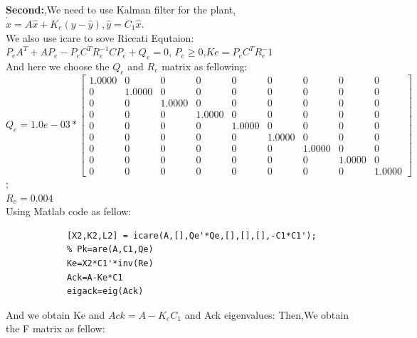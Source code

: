 \documentclass[12pt, a4paper]{article}
\begin{document}
\begin{enumerate}[1.]
\begin{enumerate}[(a)]
        \textbf{Second:},We need to use Kalman filter for the plant,
        $ \dot{\hat{x}}=A\hat{x}+K_e(y-\hat{y}),\hat{y}=C_1\hat{x}$. \\
        We also use icare to sove Riccati Equtaion:\\
        $ P_eA^T+AP_e-P_eC^TR_e^{-1}CP_e+Q_e=0 $, $ P_e \geq 0 $,$ Ke=P_eC^TR_e^-1 $ \\
        And here we choose the $ Q_e $ and $ R_e $ matrix as fellowing:\\
        $Q_e=1.0e-03 *\begin{bmatrix}
            1.0000&         0&         0&         0&         0&         0&         0&         0&         0 \\
                 0&    1.0000&         0&         0&         0&         0&         0&         0&         0 \\
                 0&         0&    1.0000&         0&         0&         0&         0&         0&         0 \\
                 0&         0&         0&    1.0000&         0&         0&         0&         0&         0 \\
                 0&         0&         0&         0&    1.0000&         0&         0&         0&         0 \\
                 0&         0&         0&         0&         0&    1.0000&         0&         0&         0 \\
                 0&         0&         0&         0&         0&         0&    1.0000&         0&         0 \\
                 0&         0&         0&         0&         0&         0&         0&    1.0000&         0 \\
                 0&         0&         0&         0&         0&         0&         0&         0&    1.0000 
            \end{bmatrix}
        $;\\
        $ R_e=0.004 $ \\
        Using Matlab code as fellow:\\
        \begin{lstlisting}
            [X2,K2,L2] = icare(A,[],Qe'*Qe,[],[],[],-C1*C1');
            % Pk=are(A,C1,Qe)
            Ke=X2*C1'*inv(Re)
            Ack=A-Ke*C1
            eigack=eig(Ack)
        \end{lstlisting} 
        And we obtain Ke and $Ack=A-K_eC_1$ and Ack eigenvalues:
        Then,We obtain the F matrix as fellow: \\

\end{enumerate}
\end{enumerate}
\end{document}
